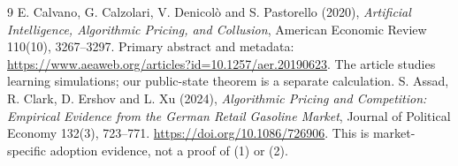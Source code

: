 \documentclass[11pt,a4paper]{article}
\theoremstyle{remark}
\begin{document}
\begin{thebibliography}{9}
 E. Calvano, G. Calzolari, V. Denicol\`o and S. Pastorello (2020), \emph{Artificial Intelligence, Algorithmic Pricing, and Collusion}, American Economic Review 110(10), 3267--3297. Primary abstract and metadata: \url{https://www.aeaweb.org/articles?id=10.1257/aer.20190623}. The article studies learning simulations; our public-state theorem is a separate calculation.
 S. Assad, R. Clark, D. Ershov and L. Xu (2024), \emph{Algorithmic Pricing and Competition: Empirical Evidence from the German Retail Gasoline Market}, Journal of Political Economy 132(3), 723--771. \url{https://doi.org/10.1086/726906}. This is market-specific adoption evidence, not a proof of (1) or (2).
\end{thebibliography}
\end{document}
